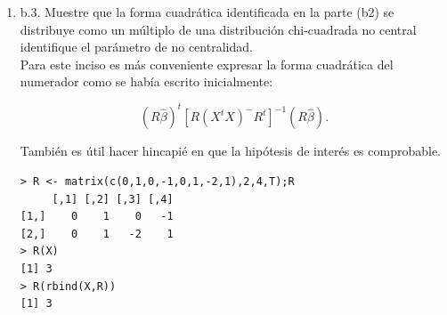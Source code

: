\documentclass[12pt,a4paper]{report}
\begin{document}
\begin{itemize}
\begin{enumerate}
Usando la propiedad:  $B$ es una matriz de constantes $k\times p$, $A$ es una matriz simétrica de constantes $p \times p$ y $X \sim N_p(\mu, \Sigma)$. Entonces $X^tBX$ y $X^tAX$ son independientes si y sólo si $B\Sigma A = O$.\\

Con lo que $A=(I - X(X^tX)^{-}X^t)$ es una matriz simétrica de constantes $8 \times 8$, \[B=[X(X^tX)^{-}R^t[R(X^tX)^{-}R^t]^{-1}R(X^tX)^{-}X^t]\] es una matriz de constantes $8 \times 8$ y $Y \sim N_8(X\beta, \sigma^2 I)$, por lo que para probar que $Y^tBY$ y $Y^tAY$ son independientes, es suficiente verificar que  $B(\sigma^2 I) A = O$.

Nótese que 
\[B(\sigma^2 I) A = \sigma^2 BIA = \sigma^2 BA.\]
Basta con verificar que $BA=O$. Esto se puede hacer rápidamente con ayuda de R:

\begin{verbatim}
> R <- matrix(c(0,1,0,-1,0,1,-2,1),2,4,T);R
     [,1] [,2] [,3] [,4]
[1,]    0    1    0   -1
[2,]    0    1   -2    1
> A <- diag(8) - X%*%invXtX%*%t(X)
> B <- X%*%invXtX%*%t(R)%*%solve(R%*%invXtX%*%t(R))%*%R%*%invXtX%*%t(X)
> B%*%A
     [,1] [,2] [,3] [,4] [,5] [,6] [,7] [,8]
[1,]    0    0    0    0    0    0    0    0
[2,]    0    0    0    0    0    0    0    0
[3,]    0    0    0    0    0    0    0    0
[4,]    0    0    0    0    0    0    0    0
[5,]    0    0    0    0    0    0    0    0
[6,]    0    0    0    0    0    0    0    0
[7,]    0    0    0    0    0    0    0    0
[8,]    0    0    0    0    0    0    0    0
\end{verbatim}

Se concluye que la forma cuadrática del numerador es independiente de $SCE=Y^t(I-X(X^tX)^-X^t)Y$.

\item b.3. Muestre que la forma cuadrática identificada en la parte (b2) se distribuye como un múltiplo de una distribución chi-cuadrada no central identifique el parámetro de no centralidad.\\

 Para este inciso es más conveniente expresar la forma cuadrática del numerador como se había escrito inicialmente:
 
 \[(R\widehat{\beta})^t[R(X^tX)^{-}R^t]^{-1}(R\widehat{\beta}).\]
 
 También es útil hacer hincapié en que la hipótesis de interés es comprobable.
 
\begin{verbatim}
> R <- matrix(c(0,1,0,-1,0,1,-2,1),2,4,T);R
     [,1] [,2] [,3] [,4]
[1,]    0    1    0   -1
[2,]    0    1   -2    1
> R(X)
[1] 3
> R(rbind(X,R))
[1] 3
\end{verbatim}


\end{enumerate}
\end{itemize}
\end{document}
